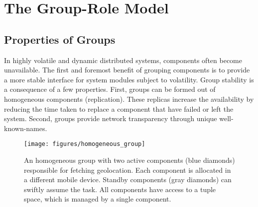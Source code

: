 \section{The Group-Role Model}
\label{sec:model}

\subsection{Properties of Groups}




In highly volatile and dynamic distributed systems, components often become unavailable. The first and foremost benefit of grouping components is to provide a more stable interface for system modules subject to volatility. Group stability is a consequence of a few properties. First, groups can be formed out of homogeneous components (replication). These replicas increase the availability by reducing the time taken to replace a component that have failed or left the system. Second, groups provide network transparency through unique well-known-names.

\begin{figure}[ht!]
	\centering
	\texttt{[image: figures/homogeneous\_group]}
	\caption{An homogeneous group with two active components (blue diamonds) responsible for fetching geolocation. Each component is allocated in a different mobile device. Standby components (gray diamonds) can swiftly assume the task. All components have access to a tuple space, which is managed by a single component.}
	\label{fig:homogeneous_group}
\end{figure}

